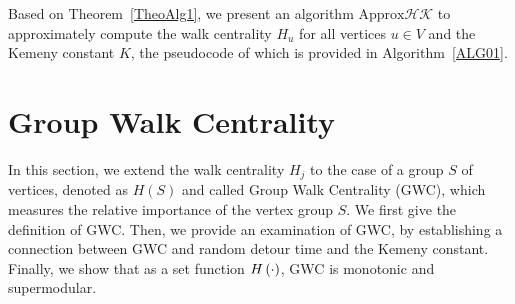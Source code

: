 \documentclass[10pt,twocolumn,twoside]{IEEEtran}
\begin{document}
Based on Theorem~\ref{TheoAlg1}, we  present an algorithm \(\text{Approx}\mathcal{HK}\) to approximately compute the walk centrality \(H_u\) for all  vertices  \(u \in V\) and the Kemeny constant \(K\), the pseudocode of which is provided in Algorithm~\ref{ALG01}.


\section{Group Walk Centrality}

In this section, we extend the walk centrality \(H_j\) to the case of a group  $S$ of  vertices, denoted as \(H(S)\) and called Group Walk Centrality (GWC), which measures the relative importance of the vertex group $S$. We first give the definition of GWC. Then, we provide an examination of GWC, by establishing a connection between GWC and random detour time and the Kemeny constant. Finally, we show that as a set function \(H\left(\cdot\right)\), GWC is monotonic and supermodular.

\end{document}
